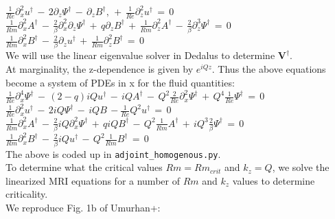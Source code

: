 \documentclass[letterpaper,12pt]{article}
\newcommand\reye{\mathrel{Re}}
\newcommand\reym{\mathrel{Rm}}
\begin{document}
$\frac{1}{\reye}\partial_x^2 u^\dagger \, - \, 2 \partial_z \Psi^\dagger \, - \, \partial_z B^\dagger, \, + \, \frac{1}{\reye}\partial_z^2 u^\dagger \, = \, 0$ \\

$\frac{1}{\reym} \partial_x^2 A^\dagger \, - \, \frac{2}{\beta} \partial_x^2 \partial_z \Psi^\dagger \, + \, q \partial_z B^\dagger  \,+ \, \frac{1}{\reym} \partial_z^2 A^\dagger \, - \, \frac{2}{\beta} \partial_z^3 \Psi^\dagger \, = \, 0$ \\

$\frac{1}{\reym} \partial_x^2 B^\dagger \, - \, \frac{2}{\beta} \partial_z u^\dagger \, + \, \frac{1}{\reym} \partial_z^2 B^\dagger \, = \, 0$ \\

We will use the linear eigenvalue solver in Dedalus to determine $\mathbf{V}^\dagger$. \\

At marginality, the z-dependence is given by $e^{iQz}$. Thus the above equations become a system of PDEs in x for the fluid quantities: \\

$\frac{1}{\reye}\partial_x^4 \Psi^\dagger \, - \, (2 - q) i Q u^\dagger \, - \,  i Q A^\dagger \, - \, Q^2 \frac{2}{\reye} \partial_x^2 \Psi^\dagger \, + \, Q^4 \frac{1}{\reye} \Psi^\dagger \, = \, 0$ \\

$\frac{1}{\reye}\partial_x^2 u^\dagger \, - \, 2 i Q \Psi^\dagger \, - \, i Q B \, - \frac{1}{\reye} Q^2 u^\dagger \, = \, 0$ \\

$\frac{1}{\reym} \partial_x^2 A^\dagger \, - \, \frac{2}{\beta} i Q \partial_x^2 \Psi^\dagger \, + \, q i Q B^\dagger \, - \, Q^2 \frac{1}{\reym} A^\dagger \, + \, i Q^3 \frac{2}{\beta} \Psi^\dagger \, = \, 0$ \\

$\frac{1}{\reym} \partial_x^2 B^\dagger \, - \, \frac{2}{\beta} i Q u^\dagger \, - \, Q^2 \frac{1}{\reym} B^\dagger \, = \, 0$ \\

The above is coded up in \texttt{adjoint\_homogenous.py}. \\

To determine what the critical values $\reym = \reym_{crit}$ and $k_z = Q$, we solve the linearized MRI equations for a number of $\reym$ and $k_z$ values to determine criticality. \\

We reproduce Fig. 1b of Umurhan+: \\
\end{document}
